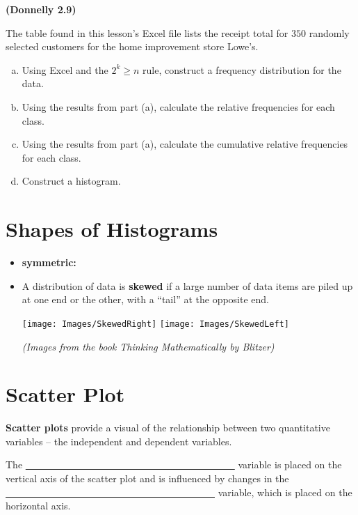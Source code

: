 \documentclass[12pt, letterpaper]{article}
\newcounter{exercise}
\theoremstyle{definition}
\begin{document}
\begin{exercise} \textbf{(Donnelly 2.9)}

The table found in this lesson's Excel file lists the receipt total for $350$ randomly selected customers for the home improvement store Lowe's.
\begin{enumerate}[(a)]
\item Using Excel and the $2^k\geq n$ rule, construct a frequency distribution for the data.
\item Using the results from part (a), calculate the relative frequencies for each class.
\item Using the results from part (a), calculate the cumulative relative frequencies for each class.
\item Construct a histogram.
\end{enumerate}
\end{exercise}

\vfill

\section*{Shapes of Histograms}


\begin{itemize}
\item \textbf{symmetric:}
\vfill

\item A distribution of data is \textbf{skewed} if a large number of data items are piled up at one end or the other, with a “tail” at the opposite end.
\begin{center}
\begin{multicols}{2}
\texttt{[image: Images/SkewedRight]}
\texttt{[image: Images/SkewedLeft]}
\end{multicols}
\textit{(Images from the book \textit{Thinking Mathematically} by Blitzer)}
\end{center}
\end{itemize}

\newpage


\section*{Scatter Plot}

\begin{defn}
\textbf{Scatter plots} provide a visual of the relationship between two quantitative variables -- the independent and dependent variables.

\vspace{.2in}

The \underline{~~~~~~~~~~~~~~~~~~~~~~~~~~~~~~~~~~~~~~~~~~~} variable is placed on the vertical axis of the scatter plot and is influenced by changes in the \underline{~~~~~~~~~~~~~~~~~~~~~~~~~~~~~~~~~~~~~~~~~~~} variable, which is placed on the horizontal axis.
\end{defn}
\end{document}
